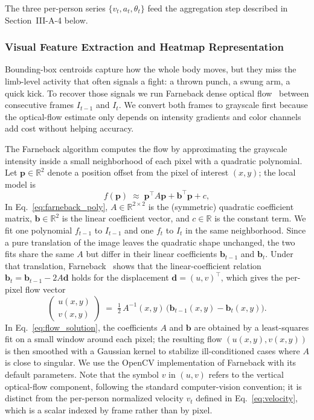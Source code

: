 \documentclass[conference]{IEEEtran}
\begin{document}
The three per-person series $\{v_t, a_t, \theta_t\}$ feed the aggregation step described in Section~III-A-4 below.

\subsubsection{Visual Feature Extraction and Heatmap Representation}

Bounding-box centroids capture how the whole body moves, but they miss the limb-level activity that often signals a fight: a thrown punch, a swung arm, a quick kick. To recover those signals we run Farneback dense optical flow~\cite{farneback_2003} between consecutive frames $I_{t-1}$ and $I_t$. We convert both frames to grayscale first because the optical-flow estimate only depends on intensity gradients and color channels add cost without helping accuracy.

The Farneback algorithm computes the flow by approximating the grayscale intensity inside a small neighborhood of each pixel with a quadratic polynomial. Let $\mathbf{p} \in \mathbb{R}^2$ denote a position offset from the pixel of interest $(x, y)$; the local model is
\begin{equation}
f(\mathbf{p}) \;\approx\; \mathbf{p}^\top A \mathbf{p} + \mathbf{b}^\top \mathbf{p} + c,
\label{eq:farneback_poly}
\end{equation}
In Eq.~\ref{eq:farneback_poly}, $A \in \mathbb{R}^{2 \times 2}$ is the (symmetric) quadratic coefficient matrix, $\mathbf{b} \in \mathbb{R}^2$ is the linear coefficient vector, and $c \in \mathbb{R}$ is the constant term. We fit one polynomial $f_{t-1}$ to $I_{t-1}$ and one $f_t$ to $I_t$ in the same neighborhood. Since a pure translation of the image leaves the quadratic shape unchanged, the two fits share the same $A$ but differ in their linear coefficients $\mathbf{b}_{t-1}$ and $\mathbf{b}_t$. Under that translation, Farneback~\cite{farneback_2003} shows that the linear-coefficient relation $\mathbf{b}_t = \mathbf{b}_{t-1} - 2 A \mathbf{d}$ holds for the displacement $\mathbf{d} = (u, v)^\top$, which gives the per-pixel flow vector
\begin{equation}
\begin{pmatrix} u(x, y) \\ v(x, y) \end{pmatrix} \;=\; \tfrac{1}{2}\, A^{-1}(x, y)\, \bigl(\mathbf{b}_{t-1}(x, y) - \mathbf{b}_t(x, y)\bigr).
\label{eq:flow_solution}
\end{equation}
In Eq.~\ref{eq:flow_solution}, the coefficients $A$ and $\mathbf{b}$ are obtained by a least-squares fit on a small window around each pixel; the resulting flow $(u(x, y), v(x, y))$ is then smoothed with a Gaussian kernel to stabilize ill-conditioned cases where $A$ is close to singular. We use the OpenCV implementation of Farneback with its default parameters. Note that the symbol $v$ in $(u, v)$ refers to the vertical optical-flow component, following the standard computer-vision convention; it is distinct from the per-person normalized velocity $v_t$ defined in Eq.~\ref{eq:velocity}, which is a scalar indexed by frame rather than by pixel.
\end{document}
